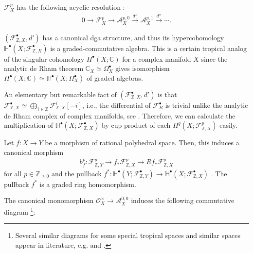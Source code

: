 \documentclass[a4paper,dvipdfmx,reqno,12pt]{amsart}
\theoremstyle{definition}
\newcommand{\C}{\mathbb{C}}%
\newcommand{\Z}{\mathbb{Z}}%
\newcommand{\mb}[1]{\mathbb{#1}}%
\newcommand{\mcal}[1]{\mathcal{#1}}%
\newcommand{\xto}[1]{\xrightarrow{#1}}
\newcommand{\myfootnote}[1]{\hspace{-5pt}\footnote{#1}}
\numberwithin{equation}{section}
\begin{document}
$\mcal{F}^{p}_{X}$ has the following acyclic resolution
\cite[Corollary 3.18, Lemma 3.21]{MR3903579}:
\begin{align}
  0 \to \mcal{F}^{p}_{X} \to \mcal{A}^{p,0}_{X}\xto{d''} 
\mcal{A}^{p,1}_{X} \xto{d''}\cdots.
\end{align}

$(\mathcal{F}_{\mathbb{Z},X}^{\bullet},d')$ has a canonical dga structure, 
and thus its hypercohomology 
$\mb{H}^{\bullet}(X;\mcal{F}_{\mathbb{Z},X}^{\bullet})$ is a 
graded-commutative algebra. 
This is a certain tropical analog of the singular cohomology
$H^{\bullet}(X;\C)$ for a complex manifold $X$ since 
the analytic de Rham theorem $\C_X \simeq \Omega_X^{\bullet}$ 
gives isomorphism 
$H^{\bullet}(X;\C)\simeq \mb{H}^{\bullet}(X;\Omega_X^{\bullet})$
of graded algebras. 

An elementary but remarkable fact of 
$(\mcal{F}_{\mathbb{Z},X}^{\bullet},d')$ is that 
$\mcal{F}_{\mathbb{Z},X}^{\bullet}\simeq 
\bigoplus_{i\in \Z}\mcal{F}_{\mathbb{Z},X}^{i}[-i]$, i.e., the differential 
of $\mcal{F}_{B}^{\bullet}$ is trivial unlike the analytic de Rham complex
of complex manifolds, see \cite[Corollary 2.15]{smacka2017differential}.
Therefore, we can calculate the multiplication of 
$\mb{H}^{\bullet}(X;\mcal{F}_{\mathbb{Z},X}^{\bullet})$ by 
cup product of each $H^{q}(X;\mcal{F}_{\mathbb{Z},X}^{p})$ easily.

Let $f\colon X\to Y$ be a morphism of rational polyhedral 
space. Then, this induces a canonical morphism
\begin{align}
b_f^{p}\colon \mathcal{F}^{p}_{\mathbb{Z},Y}\to 
f_* \mathcal{F}^{p}_{\mathbb{Z},X} \to
Rf_*\mathcal{F}^{p}_{\mathbb{Z},X}
\end{align}
for all $p\in \mathbb{Z}_{\geq 0}$ and the pullback 
$f^{*}\colon 
\mb{H}^{\bullet}(Y;\mcal{F}_{\Z, Y}^{\bullet})\to 
\mb{H}^{\bullet}(X;\mcal{F}_{\Z, X}^{\bullet})$
\cite[Proposition 4.17]{gross2019sheaftheoretic}.
The pullback $f^{*}$ is a graded ring homomorphism. 

The canonical monomorphism $\mcal{O}^{\times}_X \to \mcal{A}^{0,0}_X$
induces the following commutative diagram 
\myfootnote{Several similar diagrams for some special tropical spaces 
and similar spaces appear
in literature, e.g. \cite[p.468]{MR2567952}
and \cite[Definition 1.45]{grossMirrorSymmetryLogarithmic2006a}.}:
\end{document}
